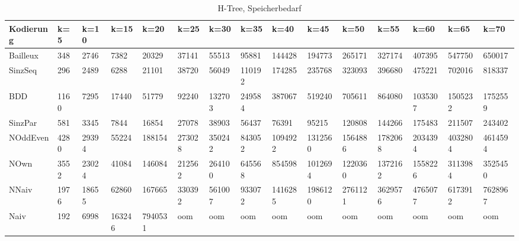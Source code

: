 \documentclass[a4,abstract=on]{scrartcl}
\begin{document}
\begin{landscape}
 \begin{table}[h!]
    \small
    \setlength{\tabcolsep}{0.11cm}
     \centering
     \begin{tabular}[width=\textwidth]{|l|l|l|l|l|l|l|l|l|l|l|l|l|l|l|}
	\hline
       \textbf{Kodierung}  & \textbf{k=5} & \textbf{k=10} & \textbf{k=15} &\textbf{k=20} &\textbf{k=25} &\textbf{k=30} &\textbf{k=35} &\textbf{k=40} &\textbf{k=45} &\textbf{k=50} &\textbf{k=55} &\textbf{k=60} &\textbf{k=65} &\textbf{k=70}\\
	\hline
	Bailleux & 348 & 2746 & 7382  & 20329 & 37141 & 55513 & 95881 & 144428 & 194773 & 265171 & 327174 & 407395 & 547750 & 650017\\
\hline
	SinzSeq & 296 & 2489 & 6288 & 21101 & 38720 & 56049 & 110192 & 174285 & 235768 & 323093 & 396680 & 475221 & 702016 & 818337 \\
\hline
	BDD & 1160 & 7295 & 17440 & 51779 & 92240 & 132703 & 249584 & 387067 & 519240 & 705611 & 864080 & 1035307 & 1505232 & 1752559\\
\hline
	SinzPar & 581 & 3345 & 7844 & 16854 & 27078 & 38903 & 56437 & 76391 & 95215 & 120808 & 144266 & 175483 & 211507 & 243402\\
\hline
	NOddEven & 4280 & 29394 & 55224 & 188154 & 273028 & 350242 & 843052 & 1094922 & 1312560 & 1564886 & 1782068 & 2034394 & 4032804 & 4614594\\
\hline
	NOwn & 3552 & 23024 & 41084 & 146084 & 212562 & 264100 & 645568 & 854598 & 1012694 & 1220360 & 1372162 & 1558226 & 3113984 & 3525450\\
 \hline
	NNaiv & 1976 & 18655 & 62860 & 167665 & 330392 & 561007 & 933072 & 1416285 & 1986120 & 2761121 & 3629576 & 4765077 & 6173912 & 7628967\\
\hline
	Naiv & 192 & 6998 & 163246 & 7940531 &  oom &  oom &  oom &  oom &  oom &  oom &  oom &  oom &  oom &  oom\\
\hline
       
     \end{tabular}

     \caption{H-Tree, Speicherbedarf}
     \label{tbl:beispieltabelle}

   \end{table}


\end{landscape}
\end{document}
